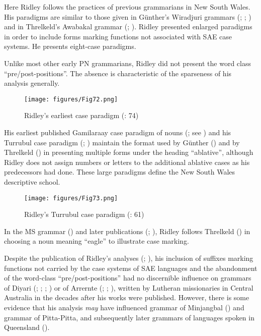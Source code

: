 Here Ridley follows the practices of previous grammarians in New South Wales. His paradigms are similar to those given in Günther’s Wiradjuri grammars (\citeyear{gunther_native_1838}; \citeyear{gunther_lecture_1840}; ) and in Threlkeld’s Awabakal grammar (\citeyear{threlkeld_australian_1834}; ). Ridley presented enlarged paradigms in order to include forms marking functions not associated with SAE case systems. He presents eight-case paradigms.

\largerpage
Unlike most other early PN grammarians, Ridley did not present the word class ``pre/post-positions''. The absence is characteristic of the sparseness of his analysis generally. 

\begin{figure}[b]
\texttt{[image: figures/Fig72.png]}
\caption{Ridley’s earliest case paradigm (\citeyear{ridley_kamilaroi_1855-1}: 74)}
\label{fig:4:72}
\end{figure}

His earliest published Gamilaraay case paradigm of nouns (\citeyear[74]{ridley_kamilaroi_1855-1}; see ) and his Turrubul case paradigm (\citeyear[61]{ridley_kamilaroi_1866}; ) maintain the format used by Günther () and by Threlkeld () in presenting multiple forms under the heading ``ablative'', although Ridley does not assign numbers or letters to the additional ablative cases as his predecessors had done. These large paradigms define the New South Wales descriptive school.



\begin{figure}
\texttt{[image: figures/Fig73.png]}
\caption{Ridley’s Turrubul case paradigm (\citeyear{ridley_kamilaroi_1866}: 61)}
\label{fig:4:73}
\end{figure}

In the MS grammar (\citeyear{ridley_kamilaroi_1855}) and later publications (\citeyear{ridley_kamilaroi_1866}; \citeyear{ridley_kamilaroi_1875}), Ridley follows Threlkeld () in choosing a noun meaning “eagle” to illustrate case marking.


Despite the publication of Ridley’s analyses (\citeyear{ridley_kamilaroi_1866}; \citeyear{ridley_kamilaroi_1875}), his inclusion of suffixes marking functions not carried by the case systems of SAE languages and the abandonment of the word-class “pre/post-positions” had no discernible influence on grammars of Diyari (\citealt{koch_untitled_1868}; \citealt{schoknecht_grammar_1947}; \citealt{flierl_christianieli_1880}; \citealt{reuther_ms_1899}) or of Arrernte (\citealt{kempe_galtjintana-pepa_1891}; \citealt{strehlow_aranda-und_1907}; \citealt{strehlow_aranda_1944}), written by Lutheran missionaries in Central Australia in the decades after his works were published. However, there is some evidence that his analysis \textit{may} have influenced  grammar of Minjangbal () and  grammar of Pitta-Pitta, and subsequently later grammars of languages spoken in Queensland ().


